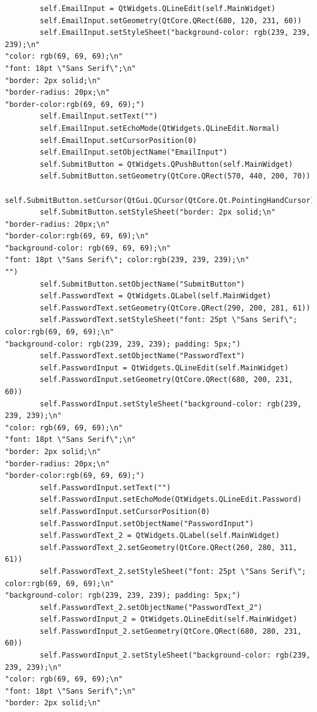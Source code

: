 \documentclass{article}
\begin{document}
\begin{lstlisting}
        self.EmailInput = QtWidgets.QLineEdit(self.MainWidget)
        self.EmailInput.setGeometry(QtCore.QRect(680, 120, 231, 60))
        self.EmailInput.setStyleSheet("background-color: rgb(239, 239, 239);\n"
"color: rgb(69, 69, 69);\n"
"font: 18pt \"Sans Serif\";\n"
"border: 2px solid;\n"
"border-radius: 20px;\n"
"border-color:rgb(69, 69, 69);")
        self.EmailInput.setText("")
        self.EmailInput.setEchoMode(QtWidgets.QLineEdit.Normal)
        self.EmailInput.setCursorPosition(0)
        self.EmailInput.setObjectName("EmailInput")
        self.SubmitButton = QtWidgets.QPushButton(self.MainWidget)
        self.SubmitButton.setGeometry(QtCore.QRect(570, 440, 200, 70))
        self.SubmitButton.setCursor(QtGui.QCursor(QtCore.Qt.PointingHandCursor))
        self.SubmitButton.setStyleSheet("border: 2px solid;\n"
"border-radius: 20px;\n"
"border-color:rgb(69, 69, 69);\n"
"background-color: rgb(69, 69, 69);\n"
"font: 18pt \"Sans Serif\"; color:rgb(239, 239, 239);\n"
"")
        self.SubmitButton.setObjectName("SubmitButton")
        self.PasswordText = QtWidgets.QLabel(self.MainWidget)
        self.PasswordText.setGeometry(QtCore.QRect(290, 200, 281, 61))
        self.PasswordText.setStyleSheet("font: 25pt \"Sans Serif\"; color:rgb(69, 69, 69);\n"
"background-color: rgb(239, 239, 239); padding: 5px;")
        self.PasswordText.setObjectName("PasswordText")
        self.PasswordInput = QtWidgets.QLineEdit(self.MainWidget)
        self.PasswordInput.setGeometry(QtCore.QRect(680, 200, 231, 60))
        self.PasswordInput.setStyleSheet("background-color: rgb(239, 239, 239);\n"
"color: rgb(69, 69, 69);\n"
"font: 18pt \"Sans Serif\";\n"
"border: 2px solid;\n"
"border-radius: 20px;\n"
"border-color:rgb(69, 69, 69);")
        self.PasswordInput.setText("")
        self.PasswordInput.setEchoMode(QtWidgets.QLineEdit.Password)
        self.PasswordInput.setCursorPosition(0)
        self.PasswordInput.setObjectName("PasswordInput")
        self.PasswordText_2 = QtWidgets.QLabel(self.MainWidget)
        self.PasswordText_2.setGeometry(QtCore.QRect(260, 280, 311, 61))
        self.PasswordText_2.setStyleSheet("font: 25pt \"Sans Serif\"; color:rgb(69, 69, 69);\n"
"background-color: rgb(239, 239, 239); padding: 5px;")
        self.PasswordText_2.setObjectName("PasswordText_2")
        self.PasswordInput_2 = QtWidgets.QLineEdit(self.MainWidget)
        self.PasswordInput_2.setGeometry(QtCore.QRect(680, 280, 231, 60))
        self.PasswordInput_2.setStyleSheet("background-color: rgb(239, 239, 239);\n"
"color: rgb(69, 69, 69);\n"
"font: 18pt \"Sans Serif\";\n"
"border: 2px solid;\n"

\end{lstlisting}
\end{document}
